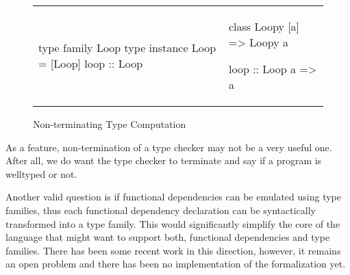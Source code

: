 \documentclass[format=sigplan,manuscript,review,screen, nonacm]{acmart}
\begin{document}
\begin{figure}[ht]
  \begin{tabular}{l l}
    \begin{code}
      type family Loop
      type instance Loop = [Loop]
      loop :: Loop
    \end{code}&%
  \begin{code}
    class Loopy [a] => Loopy a
    
    loop :: Loop a => a
  \end{code}
  \end{tabular}
  \caption{Non-terminating Type Computation}
  \label{fig:non-termination}
\end{figure}
As a feature, non-termination of a type checker may not be a very useful one. After all, we do want
the type checker to terminate and say if a program is welltyped or not.

Another valid question is if functional dependencies can be emulated using type families, thus each functional
dependency declaration can be syntactically transformed into a type family. This would significantly simplify
the core of the language that might want to support both, functional dependencies and type families. There has
been some recent work\cite{karachalias_elaboration_2017} in this direction, however, it remains an open problem
and there has been no implementation of the formalization yet. 

\newpage


\end{document}
